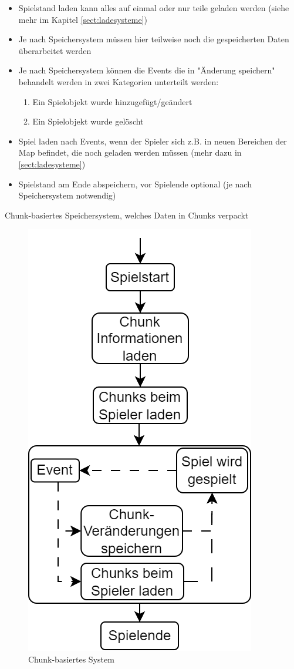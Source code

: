 \begin{itemize}
    \item Spielstand laden kann alles auf einmal oder nur teile geladen werden (siehe mehr im Kapitel \ref{sect:ladesysteme})
    \item Je nach Speichersystem müssen hier teilweise noch die gespeicherten Daten überarbeitet werden
    \item Je nach Speichersystem können die Events die in "Änderung speichern" behandelt werden in zwei Kategorien unterteilt werden:
    \begin{enumerate}
        \item Ein Spielobjekt wurde hinzugefügt/geändert
        \item Ein Spielobjekt wurde gelöscht
    \end{enumerate}
    \item Spiel laden nach Events, wenn der Spieler sich z.B. in neuen Bereichen der Map befindet, die noch geladen werden müssen (mehr dazu in \ref{sect:ladesysteme})
    \item Spielstand am Ende abspeichern, vor Spielende optional (je nach Speichersystem notwendig)
\end{itemize}

Chunk-basiertes Speichersystem, welches Daten in Chunks verpackt
\begin{figure}[H]
    \centering
    \includegraphics[scale=0.5]{images/Speichersys1.png}
    \caption{Chunk-basiertes System}
    \label{fig:chunkbasedsystem}
\end{figure}

